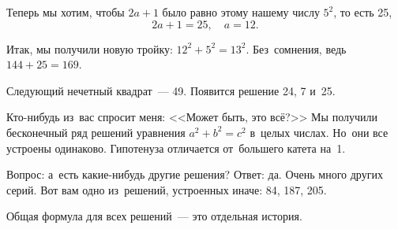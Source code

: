 Теперь мы хотим, чтобы $2a + 1$ было равно этому нашему числу $5^{2}$, то есть 25,
$$
2a + 1 = 25,\quad
a=12.
$$


%
%
%
%
%
%
%

\noindent
Итак, мы получили новую тройку: $12^{2} + 5^{2} = 13^{2}$. Без~сомнения, ведь $144 + 25= 169$.

Следующий нечетный квадрат~--- 49. Появится решение 24, 7 и~25.

Кто-нибудь из~вас спросит меня: <<Может быть, это всё?>> Мы получили бесконечный ряд решений
уравнения $a^{2}+b^{2}=c^{2}$ в~целых числах. Но~они все устроены одинаково. Гипотенуза отличается
от~большего катета на~1.

Вопрос: а~есть какие-нибудь другие решения? Ответ: да. Очень много других серий. Вот вам одно
из~решений, устроенных иначе: 84, 187, 205.

Общая формула для всех решений~--- это отдельная история.



\endinput
